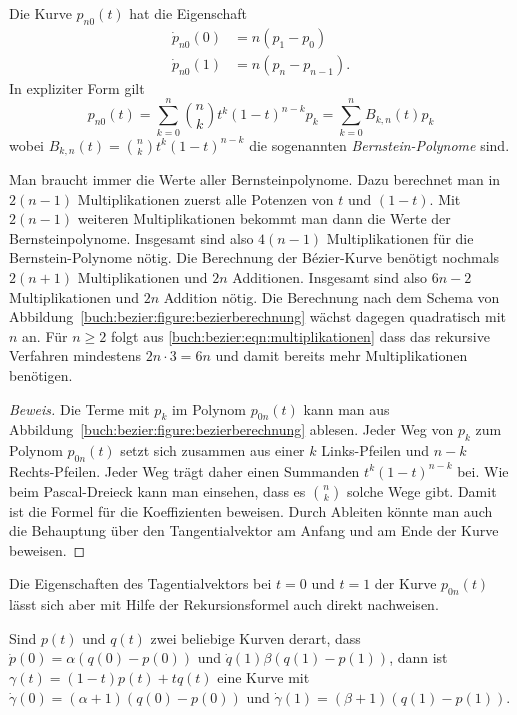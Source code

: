 \begin{satz}
\label{buch:bezier:satz}
Die Kurve $p_{n0}(t)$ hat die Eigenschaft
\begin{align*}
\dot{p}_{n0}(0) &= n (p_1-p_0)
\\
\dot{p}_{n0}(1) &= n (p_n-p_{n-1}).
\end{align*}
In expliziter Form gilt
\[
p_{n0}(t)
=
\sum_{k=0}^n \binom{n}{k} t^k(1-t)^{n-k} p_k
=
\sum_{k=0}^n B_{k,n}(t) p_k
\]
wobei $B_{k,n}(t) = \binom{n}{k}t^k(1-t)^{n-k}$
die sogenannten {\em Bernstein-Polynome} sind.
%
\end{satz}

Man braucht immer die Werte aller Bernsteinpolynome.
Dazu berechnet man in $2(n-1)$ Multiplikationen zuerst alle
Potenzen von $t$ und $(1-t)$.
Mit $2(n-1)$ weiteren Multiplikationen bekommt man dann die Werte
der Bernsteinpolynome.
Insgesamt sind also $4(n-1)$ Multiplikationen für die Bernstein-Polynome
nötig.
Die Berechnung der Bézier-Kurve benötigt nochmals $2(n+1)$ Multiplikationen
und $2n$ Additionen.
Insgesamt sind also $6n-2$ Multiplikationen und $2n$ Addition nötig.
Die Berechnung nach dem Schema von 
Abbildung~\ref{buch:bezier:figure:bezierberechnung} wächst dagegen 
quadratisch mit $n$ an.
Für $n\ge 2$ folgt aus \eqref{buch:bezier:eqn:multiplikationen}
dass das rekursive Verfahren mindestens $2n\cdot 3=6n$ und damit
bereits mehr Multiplikationen benötigen.

\begin{proof}[Beweis]
Die Terme mit $p_k$ im Polynom $p_{0n}(t)$ kann man aus
Abbildung~\ref{buch:bezier:figure:bezierberechnung} ablesen.
Jeder Weg von $p_k$ zum Polynom $p_{0n}(t)$ setzt sich zusammen aus
einer $k$ Links-Pfeilen und $n-k$ Rechts-Pfeilen.
Jeder Weg trägt daher einen Summanden $t^k(1-t)^{n-k}$ bei.
Wie beim Pascal-Dreieck kann man einsehen, dass es $\binom{n}{k}$
solche Wege gibt.
Damit ist die Formel für die Koeffizienten beweisen.
Durch Ableiten könnte man auch die Behauptung über den Tangentialvektor
am Anfang und am Ende der Kurve beweisen.
\end{proof}

Die Eigenschaften des Tagentialvektors bei $t=0$ und $t=1$
der Kurve $p_{0n}(t)$ lässt sich aber mit Hilfe der Rekursionsformel
auch direkt nachweisen.

\begin{lemma}
Sind $p(t)$ und $q(t)$ zwei beliebige Kurven derart, dass
$\dot{p}(0) = \alpha( q(0)-p(0))$ und $\dot{q}(1) \beta( q(1)-p(1))$,
dann ist
$\gamma(t) = (1-t)p(t) + tq(t)$
eine Kurve mit
$\dot{\gamma}(0)=(\alpha+1)(q(0)-p(0))$
und
$\dot{\gamma}(1)=(\beta+1)(q(1)-p(1))$.
\end{lemma}

